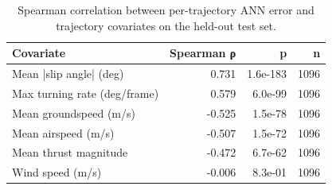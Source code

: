 \begin{table}[h!]
    \centering
    \caption{Spearman correlation between per-trajectory ANN error and trajectory covariates on the held-out test set.}
    \label{tab:covariates}
    \begin{tabular}{@{}lrrr@{}}
        \toprule
        Covariate & Spearman ρ & p & n \\
        \midrule
        Mean |slip angle| (deg) & 0.731 & 1.6e-183 & 1096 \\
        Max turning rate (deg/frame) & 0.579 & 6.0e-99 & 1096 \\
        Mean groundspeed (m/s) & -0.525 & 1.5e-78 & 1096 \\
        Mean airspeed (m/s) & -0.507 & 1.5e-72 & 1096 \\
        Mean thrust magnitude & -0.472 & 6.7e-62 & 1096 \\
        Wind speed (m/s) & -0.006 & 8.3e-01 & 1096 \\
        \bottomrule
    \end{tabular}
\end{table}
